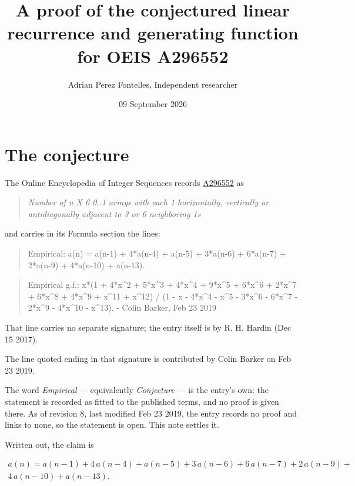 \documentclass[11pt]{article}
\title{A proof of the conjectured linear recurrence and generating function for OEIS A296552}
\author{Adrian Perez Fontelles, Independent researcher}
\date{09 September 2026}
\theoremstyle{definition}
\begin{document}
\maketitle
\section{The conjecture}

The Online Encyclopedia of Integer Sequences records \href{https://oeis.org/A296552}{A296552} as

\begin{quote}\itshape Number of n X 6 0..1 arrays with each 1 horizontally, vertically or antidiagonally adjacent to 3 or 6 neighboring 1s\end{quote}

and carries in its Formula section the lines:

\begin{quote}\ttfamily Empirical: a(n) = a(n-1) + 4*a(n-4) + a(n-5) + 3*a(n-6) + 6*a(n-7) + 2*a(n-9) + 4*a(n-10) + a(n-13).\end{quote}

\begin{quote}\ttfamily Empirical g.f.: x*(1 + 4*x\textasciicircum{}2 + 5*x\textasciicircum{}3 + 4*x\textasciicircum{}4 + 9*x\textasciicircum{}5 + 6*x\textasciicircum{}6 + 2*x\textasciicircum{}7 + 6*x\textasciicircum{}8 + 4*x\textasciicircum{}9 + x\textasciicircum{}11 + x\textasciicircum{}12) / (1 - x - 4*x\textasciicircum{}4 - x\textasciicircum{}5 - 3*x\textasciicircum{}6 - 6*x\textasciicircum{}7 - 2*x\textasciicircum{}9 - 4*x\textasciicircum{}10 - x\textasciicircum{}13). - Colin Barker, Feb 23 2019\end{quote}

That line carries no separate signature; the entry itself is by R. H. Hardin (Dec 15 2017).

The line quoted ending in that signature is contributed by Colin Barker on Feb 23 2019.

The word {\itshape Empirical} --- equivalently {\itshape Conjecture} --- is the entry's own: the statement is recorded as fitted to the published terms, and no proof is given there. As of revision 8, last modified Feb 23 2019, the entry records no proof and links to none, so the statement is open. This note settles it.

Written out, the claim is

\begin{multline*} a(n) = a(n-1) + 4\,a(n-4) + a(n-5) + 3\,a(n-6) + 6\,a(n-7) + 2\,a(n-9) + \\ 4\,a(n-10) + a(n-13). \end{multline*}
\end{document}
